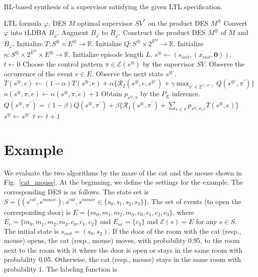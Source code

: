 \documentclass[letterpaper, 10 pt, conference]{ieeeconf}
\newcommand{\myspq}{\ensuremath{[\![s^{\otimes}]\!]}_q}
\begin{document}
\begin{algorithm}
 \caption{RL-based synthesis of a supervisor satisfying the given LTL specification.}
 \begin{algorithmic}[1]
 \renewcommand{\algorithmicrequire}{\textbf{Input:}}
 \renewcommand{\algorithmicensure}{\textbf{Output:}}
 \REQUIRE LTL formula $\varphi$, DES $M$
 \ENSURE  optimal supervisor $SV^{\ast}$ on the product DES $M^{\otimes}$
  \STATE Convert $\varphi$ into tLDBA $B_{\varphi}$.
  \STATE Augment $B_{\varphi}$ to $\bar{B}_{\varphi}$.
  \STATE Construct the product DES $M^{\otimes}$ of $M$ and $\bar{B}_{\varphi}$.
  \STATE Initialize $T:S^{\otimes} \times E^{\otimes} \rightarrow \mathbb{R}$.
  \STATE Initialize $Q:S^{\otimes} \times 2^{E^{\otimes}} \rightarrow \mathbb{R}$.
  \STATE Initialize $n:S^{\otimes} \times 2^{E^{\otimes}} \times E^{\otimes} \rightarrow \mathbb{R}$.
  \STATE Initialize episode length $L$.
  \STATE $s^{\otimes} \leftarrow (s_{init},(x_{init},\bm{0}))$.
  \STATE $t \leftarrow 0$
  \WHILE {$t <L$ and $\myspq \notin SinkSet$ }
  \STATE Choose the control pattern $\pi \in \mathcal{E}(s^{\otimes})$ by the supervisor $SV$.
  \STATE Observe the occurrence of the event $e \in E$.
  \STATE Observe the next state $s^{\otimes \prime}$.
  \STATE $T(s^{\otimes},e) \leftarrow (1-\alpha)T(s^{\otimes},e) + \alpha \{ \mathcal{R}_2(s^{\otimes},e,s^{\otimes \prime}) + \gamma \max_{\pi^{\prime} \in 2^{\mathcal{E}(s^{\otimes \prime})}}Q(s^{\otimes \prime},\pi^{\prime}) \}$
  \STATE $n(s^{\otimes}, \pi, e) \leftarrow n(s^{\otimes}, \pi, e) + 1$
  \STATE Obtain $p_{s^{\otimes},\pi}$ by the $P_E$ inference.
  \STATE $Q(s^{\otimes},\pi^{\prime}) = (1-\beta)Q(s^{\otimes},\pi^{\prime}) + \beta \{\mathcal{R}_1(s^{\otimes},\pi^{\prime}) + \sum_{e \in \pi} p_{s^{\otimes},\pi,e} T(s^{\otimes},e)$\}
  \STATE $s^{\otimes} \leftarrow s^{\otimes \prime}$
  \STATE $t \leftarrow t + 1$
  \ENDWHILE
  \ENDWHILE
 \end{algorithmic}
 \label{alg1}
 \end{algorithm}

\section{Example}
We evaluate the two algorithms by the maze of the cat and the mouse shown in Fig.\ \ref{cat_mouse}. At the beginning, we define the settings for the example. The corresponding DES is as follows. The state set is $S = \{ (s^{cat}, s^{mouse}) ; s^{cat},s^{mouse} \in \{ s_0,s_1,s_2,s_3 \} \}$. The set of events (to open the corresponding door) is $E = \{ m_0, m_1, m_2, m_3, c_0, c_1, c_2, c_3 \}$, where $E_{c} = \{ m_0, m_1, m_2, m_3, c_0, c_1, c_2 \}$ and $E_{uc} = \{ c_3 \}$ and $\mathcal{E}(s) = E$ for any $s \in S$. The initial state is $s_{init} = (s_0, s_2)$. If the door of the room with the cat (resp., mouse) opens, the cat (resp., mouse) moves, with probability 0.95, to the room next to the room with it where the door is open or stays in the same room with probability 0.05. Otherwise, the cat (resp., mouse) stays in the same room with probability 1. The labeling function is
\end{document}
